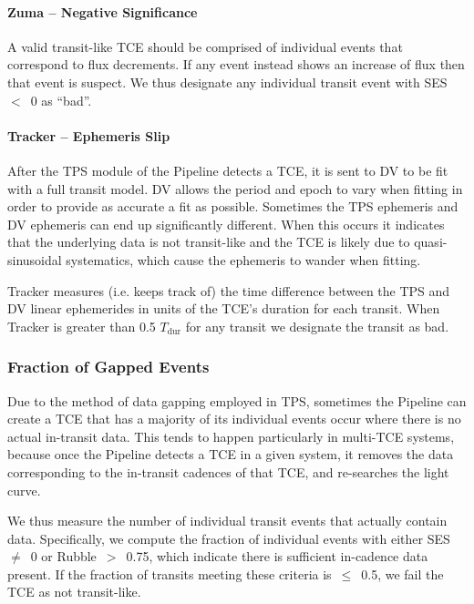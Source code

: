 \paragraph{Zuma -- Negative Significance}
\label{s:zuma}

A valid transit-like TCE should be comprised of individual events that correspond to flux decrements. If any event instead shows an increase of flux then that event is suspect. We thus designate any individual transit event with SES~$<$~0 as ``bad''.


\paragraph{Tracker -- Ephemeris Slip}
\label{s:tracker}
After the TPS module of the \kepler{} Pipeline detects a TCE, it is sent to DV to be fit with a full transit model. DV allows the period and epoch to vary when fitting in order to provide as accurate a fit as possible. Sometimes the TPS ephemeris and DV ephemeris can end up significantly different. When this occurs it indicates that the underlying data is not transit-like and the TCE is likely due to quasi-sinusoidal systematics, which cause the ephemeris to wander when fitting.

Tracker measures (i.e. keeps track of) the time difference between the TPS and DV linear ephemerides in units of the TCE's duration for each transit. When Tracker is greater than  0.5 $T_{\mathrm{dur}}$ for any transit we designate the transit as bad.


\subsubsection{Fraction of Gapped Events}
\label{s:rocky}

Due to the method of data gapping employed in TPS, sometimes the \kepler{} Pipeline can create a TCE that has a majority of its individual events occur where there is no actual in-transit data. This tends to happen particularly in multi-TCE systems, because once the \kepler{} Pipeline detects a TCE in a given system, it removes the data corresponding to the in-transit cadences of that TCE, and re-searches the light curve. 

We thus measure the number of individual transit events that actually contain data. Specifically, we compute the fraction of individual events with either SES~$\ne$~0 or Rubble~$>$~0.75, which indicate there is sufficient in-cadence data present. If the fraction of transits meeting these criteria is~$\le$~0.5, we fail the TCE as not transit-like.


